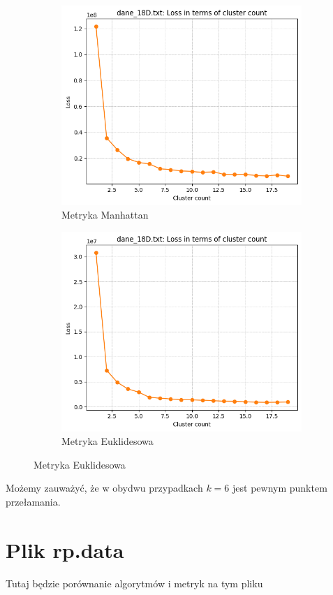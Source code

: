 \documentclass[polish,12pt,a4paper]{extarticle}
\begin{document}
\begin{figure}[h!]
    \centering
    \begin{subfigure}[b]{0.30\textwidth}
        \includegraphics[width=\linewidth]{img/elbow/data18d_manhattan.png}
        \captionsetup{labelformat=empty}
        \caption{Metryka Manhattan}
    \end{subfigure}
    \hspace{}
    \begin{subfigure}[b]{0.30\textwidth}
        \includegraphics[width=\linewidth]{img/elbow/data18d.png}
        \captionsetup{labelformat=empty}
        \caption{Metryka Euklidesowa}
    \end{subfigure}

    \label{fig:data_grid}
\end{figure} \FloatBarrier

Możemy zauważyć, że w obydwu przypadkach $k = 6$ jest pewnym punktem przełamania.
\section{Plik rp.data}
Tutaj będzie porównanie algorytmów i metryk na tym pliku
\end{document}
